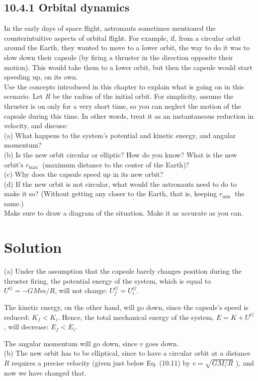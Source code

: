 \documentclass[10pt]{article}
\begin{document}
\subsection*{10.4.1 Orbital dynamics}
In the early days of space flight, astronauts sometimes mentioned the counterintuitive aspects of orbital flight. For example, if, from a circular orbit around the Earth, they wanted to move to a lower orbit, the way to do it was to slow down their capsule (by firing a thruster in the direction opposite their motion). This would take them to a lower orbit, but then the capsule would start speeding up, on its own.\\
Use the concepts introduced in this chapter to explain what is going on in this scenario. Let $R$ be the radius of the initial orbit. For simplicity, assume the thruster is on only for a very short time, so you can neglect the motion of the capsule during this time. In other words, treat it as an instantaneous reduction in velocity, and discuss:\\
(a) What happens to the system's potential and kinetic energy, and angular momentum?\\
(b) Is the new orbit circular or elliptic? How do you know? What is the new orbit's $r_{\text {max }}$ (maximum distance to the center of the Earth)?\\
(c) Why does the capsule speed up in its new orbit?\\
(d) If the new orbit is not circular, what would the astronauts need to do to make it so? (Without getting any closer to the Earth, that is, keeping $r_{\text {min }}$ the same.)\\
Make sure to draw a diagram of the situation. Make it as accurate as you can.

\section*{Solution}
(a) Under the assumption that the capsule barely changes position during the thruster firing, the potential energy of the system, which is equal to $U^{G}=-G M m / R$, will not change: $U_{f}^{G}=U_{i}^{G}$.

The kinetic energy, on the other hand, will go down, since the capsule's speed is reduced: $K_{f}<K_{i}$. Hence, the total mechanical energy of the system, $E=K+U^{G}$, will decrease: $E_{f}<E_{i}$.

The angular momentum will go down, since $v$ goes down.\\
(b) The new orbit has to be elliptical, since to have a circular orbit at a distance $R$ requires a precise velocity (given just below Eq. (10.11) by $v=\sqrt{G M / R}$ ), and now we have changed that.
\end{document}
